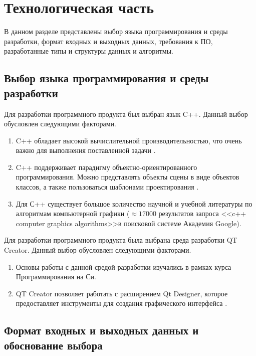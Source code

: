 \chapter{Технологическая часть}

В данном разделе представлены выбор языка программирования и среды разработки, формат входных и выходных данных, требования к ПО, разработанные типы и структуры данных и алгоритмы.

\section{Выбор языка программирования и среды разработки}
Для разработки программного продукта был выбран язык C++.  Данный выбор обусловлен следующими факторами.

\begin{enumerate}[label=\arabic*)]
	\item C++ обладает высокой вычислительной производительностью, что очень важно для выполнения поставленной задачи \cite{cplusplusperfomance}.
	\item C++ поддерживает парадигму объектно-ориентированного программирования. Можно представлять объекты сцены в виде объектов классов, а также пользоваться шаблонами проектирования \cite{isocplusplus}.
	\item Для С++ существует большое количество научной и учебной литературы по алгоритмам компьютерной графики ($\approx17000$ результатов запроса <<c++ computer graphics algorithms>>в поисковой системе Академия Google).
\end{enumerate}

Для разработки программного продукта была выбрана среда разработки QT Creator. Данный выбор обусловлен следующими факторами.

\begin{enumerate}[label=\arabic*)]
	\item Основы работы с данной средой разработки изучались в рамках курса Программирования на Си.
	\item QT Creator позволяет работать с расширением Qt Designer, которое предоставляет инструменты для создания графического интерфейса \cite{qtdesigner}.
\end{enumerate}

\section{Формат входных и выходных данных и обоснование выбора}


